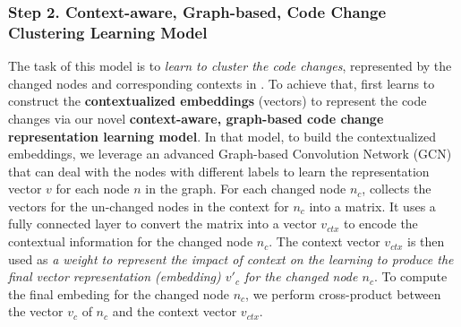 
\subsubsection{{\bf Step 2. Context-aware, Graph-based, Code Change Clustering Learning Model}} The task of this model is to {\em learn to cluster the code changes}, represented by
the changed nodes and corresponding contexts in {\mvpdg}. To achieve
that, {\tool} first learns to construct the {\bf contextualized
  embeddings} (vectors) to represent the code changes via our novel
{\bf context-aware, graph-based code change representation learning
  model}. In that model, to build the contextualized embeddings, we
leverage an advanced Graph-based Convolution Network (GCN)~\cite{yi}
that can deal with the nodes with different labels to learn the
representation vector $v$ for each node $n$ in the graph. For each
changed node $n_c$, {\tool} collects the vectors for the un-changed
nodes in the context for $n_c$ into a matrix. It uses a fully
connected layer to convert the matrix into a vector $v_{ctx}$ to
encode the contextual information for the changed node $n_c$. The
context vector $v_{ctx}$ is then used as {\em a weight to represent
  the impact of context on the learning to produce the final vector
  representation (embedding) $v'_c$ for the changed node $n_c$}. To
compute the final embeding for the changed node $n_c$, we perform
cross-product between the vector $v_c$ of $n_c$ and the context vector
$v_{ctx}$.


